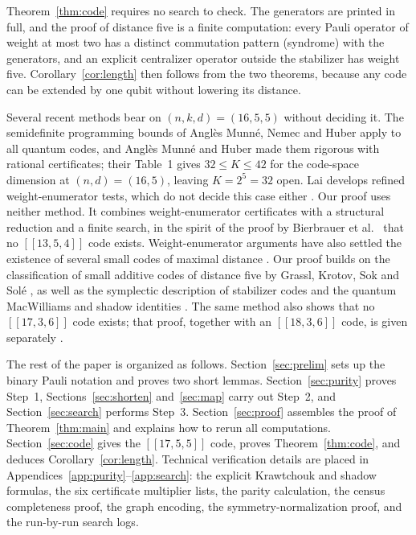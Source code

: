 \documentclass[11pt]{article}
\theoremstyle{definition}
\theoremstyle{remark}
\newcommand{\qc}[1]{[\![#1]\!]}
\begin{document}
Theorem~\ref{thm:code} requires no search to check. The generators are
printed in full, and the proof of distance five is a finite computation:
every Pauli operator of weight at most two has a distinct commutation
pattern (syndrome) with the generators, and an explicit centralizer
operator outside the stabilizer has weight five.
Corollary~\ref{cor:length} then follows from the two theorems, because
any code can be extended by one qubit without lowering its distance.

Several recent methods bear on \((n,k,d)=(16,5,5)\) without deciding it.
The semidefinite programming bounds of Angl\`es Munn\'e, Nemec and
Huber \cite{mnh} apply to all quantum codes, and Angl\`es Munn\'e and
Huber \cite{sdp} made them rigorous with rational certificates; their
Table~1 gives
\(32\leq K\leq 42\) for the code-space dimension at \((n,d)=(16,5)\),
leaving \(K=2^5=32\) open. Lai \cite{lai} develops refined
weight-enumerator tests, which do not decide this case either
\cite[Section~\mbox{VII-D}]{lai}. Our proof uses neither method. It combines
weight-enumerator certificates with a structural reduction and a finite
search, in the spirit of the proof by Bierbrauer et al.\
\cite{bierbrauer} that no \(\qc{13,5,4}\) code exists. Weight-enumerator
arguments have also settled the existence of several small codes of
maximal distance \cite{hgs,hg}. Our proof builds on the
classification of small additive codes of distance five by Grassl,
Krotov, Sok and Sol\'e \cite{dodeca}, as well as the symplectic
description of stabilizer codes \cite{crss} and the quantum MacWilliams
and shadow identities \cite{shorlaflamme,rains98,rains}. The same method also shows that no
\(\qc{17,3,6}\) code exists; that proof, together with an
\(\qc{18,3,6}\) code, is given separately \cite{li17}.

The rest of the paper is organized as follows.
Section~\ref{sec:prelim} sets up the binary Pauli notation and proves
two short lemmas. Section~\ref{sec:purity} proves Step~1,
Sections~\ref{sec:shorten} and~\ref{sec:map} carry out Step~2, and
Section~\ref{sec:search} performs Step~3. Section~\ref{sec:proof}
assembles the proof of Theorem~\ref{thm:main} and explains how to rerun
all computations. Section~\ref{sec:code} gives the \(\qc{17,5,5}\) code,
proves Theorem~\ref{thm:code}, and deduces Corollary~\ref{cor:length}.
Technical verification details are placed in
Appendices~\ref{app:purity}--\ref{app:search}: the explicit Krawtchouk
and shadow formulas, the six certificate multiplier lists, the parity
calculation, the census completeness proof, the graph encoding, the
symmetry-normalization proof, and the run-by-run search logs.
\end{document}
